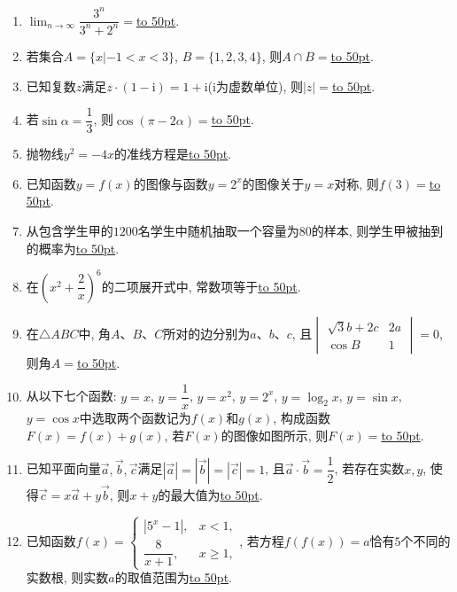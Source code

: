 \documentclass[10pt,a4paper]{article}
\newcommand{\blank}[1]{\underline{\hbox to #1pt{}}}
\begin{document}
\begin{enumerate}[1.]
\item $\displaystyle\lim_{n\to \infty}\dfrac{3^n}{3^n+2^n}=$\blank{50}.
\item 若集合$A=\{x|-1<x<3\}$, $B=\{1,2,3,4\}$, 则$A\cap B=$\blank{50}.
\item 已知复数$z$满足$z\cdot (1-\mathrm{i})=1+\mathrm{i}$($\mathrm{i}$为虚数单位), 则$|z|=$\blank{50}.
\item 若$\sin \alpha =\dfrac 13$, 则$\cos (\pi -2\alpha)=$\blank{50}.
\item 抛物线$y^2=-4x$的准线方程是\blank{50}.
\item 已知函数$y=f(x)$的图像与函数$y=2^x$的图像关于$y=x$对称, 则$f(3)=$\blank{50}.
\item 从包含学生甲的$1200$名学生中随机抽取一个容量为$80$的样本, 则学生甲被抽到的概率为\blank{50}.
\item 在$(x^2+\dfrac 2x)^6$的二项展开式中, 常数项等于\blank{50}.
\item 在$\triangle ABC$中, 角$A$、$B$、$C$所对的边分别为$a$、$b$、$c$, 且$\begin{vmatrix}
\sqrt 3b+2c & 2a  \\\cos B & 1  \end{vmatrix}=0$, 则角$A=$\blank{50}.
\item 从以下七个函数:
$y=x$, $y=\dfrac 1x$, $y=x^2$, $y=2^x$, $y=\log_2x$, $y=\sin x$, $y=\cos x$中选取两个函数记为$f(x)$和$g(x)$, 构成函数$F(x)=f(x)+g(x)$, 若$F(x)$的图像如图所示, 则$F(x)=$\blank{50}.
\begin{center}
\end{center}
\item 已知平面向量$\overrightarrow a,\overrightarrow b,\overrightarrow c$满足$|\overrightarrow a|=|\overrightarrow b|=|\overrightarrow c|=1$, 且$\overrightarrow a\cdot \overrightarrow b=\dfrac 12$, 若存在实数$x,y$, 使得$\overrightarrow c=x\overrightarrow a+y\overrightarrow b$, 则$x+y$的最大值为\blank{50}.
\item 已知函数$f(x)=\begin{cases}|5^x-1|, & x<1, \\ \dfrac{8}{x+1},& x\ge 1,  \end{cases}$, 若方程$f(f(x))=a$恰有$5$个不同的实数根, 则实数$a$的取值范围为\blank{50}.

\end{enumerate}
\end{document}
